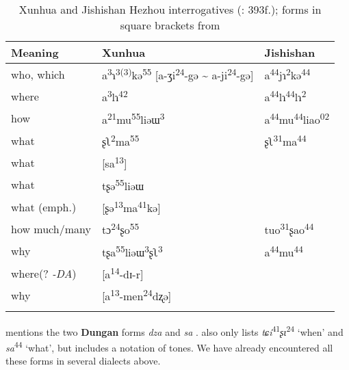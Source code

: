 \begin{table}[t]
\caption{Xunhua and Jishishan Hezhou interrogatives (\citealt{ZhongJinwen2007}: 393f.); forms in square brackets from \citet[156]{Dwyer1995}}
\label{tab:trans:9}

\begin{tabularx}{\textwidth}{Qll}
\lsptoprule

\textbf{Meaning} & \textbf{Xunhua} & \textbf{Jishishan}\\
\midrule
who, which & a\textsuperscript{3}ɿ\textsuperscript{3(3)}kə\textsuperscript{55} [a-ʒi\textsuperscript{24}-gə {\textasciitilde} a-ji\textsuperscript{24}-gə] & a\textsuperscript{44}jɿ\textsuperscript{2}kə\textsuperscript{44}\\
where & a\textsuperscript{3}lɿ\textsuperscript{42} & a\textsuperscript{44}lɿ\textsuperscript{44}lɿ\textsuperscript{2}\\
how & a\textsuperscript{21}mu\textsuperscript{55}liəɯ\textsuperscript{3} & a\textsuperscript{44}mu\textsuperscript{44}liao\textsuperscript{02}\\
what & ʂʅ\textsuperscript{2}ma\textsuperscript{55} & ʂʅ\textsuperscript{31}ma\textsuperscript{44}\\
what & [sa\textsuperscript{13}] & \\
what & tʂə\textsuperscript{55}liəɯ & \\
what (emph.) & [ʂə\textsuperscript{13}ma\textsuperscript{41}kə] & \\
how much/many & tɔ\textsuperscript{24}ʂo\textsuperscript{55} & tuo\textsuperscript{31}ʂao\textsuperscript{44}\\
why & tʂa\textsuperscript{55}liəɯ\textsuperscript{3}ʂʅ\textsuperscript{3} & a\textsuperscript{44}mu\textsuperscript{44}\\
where\newline  (? \textit{-DA}) & [a\textsuperscript{14}-dɪ-r] & \\
why & [a\textsuperscript{13}-men\textsuperscript{24}dʐə] & \\
\lspbottomrule
\end{tabularx}
\end{table}


\cite[513, 515]{Rimsky-Korsakoff1994} mentions the two \textbf{Dungan} forms \textit{dza}  and \textit{sa} . \citet[76]{Hai2002} also only lists \textit{tɕi}\textsuperscript{41}\textit{ʂɩ}\textsuperscript{24}  ‘when’ and \textit{sa}\textsuperscript{44}  ‘what’, but includes a notation of tones. We have already encountered all these forms in several dialects above.

